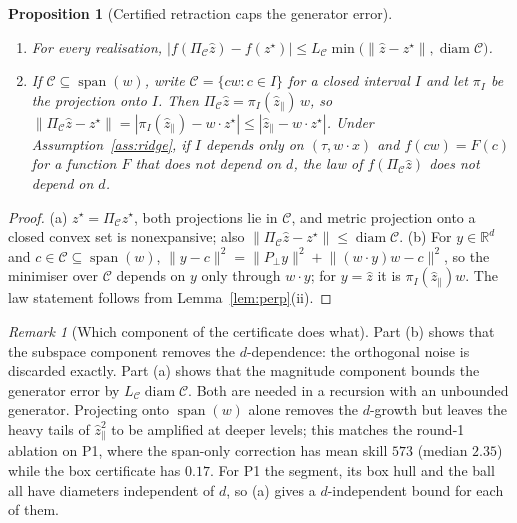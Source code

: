 \documentclass[11pt]{article}
\newtheorem{proposition}[lemma]{Proposition}
\theoremstyle{remark}
\newtheorem{remark}[lemma]{Remark}
\theoremstyle{definition}
\newcommand{\R}{\mathbb R}
\newcommand{\norm}[1]{\lVert #1\rVert}
\newcommand{\zh}{\widehat z}
\newcommand{\zpar}{\widehat z_{\parallel}}
\newcommand{\Pperp}{P_{\perp}}
\newcommand{\Proj}{\Pi}
\begin{document}
\begin{proposition}[Certified retraction caps the generator error]\label{prop:cert}
\begin{enumerate}
\item[(a)] For every realisation,
$\bigl|f(\Proj_{\mathcal C}\zh)-f(z^\star)\bigr|\le
L_{\mathcal C}\min\bigl(\norm{\zh-z^\star},\operatorname{diam}\mathcal C\bigr)$.
\item[(b)] If $\mathcal C\subseteq\operatorname{span}(w)$, write
$\mathcal C=\{cw:c\in I\}$ for a closed interval $I$ and let $\pi_I$ be the projection
onto $I$. Then $\Proj_{\mathcal C}\zh=\pi_I(\zpar)\,w$, so
$\norm{\Proj_{\mathcal C}\zh-z^\star}=|\pi_I(\zpar)-w\cdot z^\star|\le|\zpar-w\cdot z^\star|$.
Under Assumption~\ref{ass:ridge}, if $I$ depends only on $(\tau,w\cdot x)$ and
$f(cw)=F(c)$ for a function $F$ that does not depend on $d$, the law of
$f(\Proj_{\mathcal C}\zh)$ does not depend on $d$.
\end{enumerate}
\end{proposition}

\begin{proof}
(a) $z^\star=\Proj_{\mathcal C}z^\star$, both projections lie in $\mathcal C$, and metric
projection onto a closed convex set is nonexpansive; also
$\norm{\Proj_{\mathcal C}\zh-z^\star}\le\operatorname{diam}\mathcal C$.
(b) For $y\in\R^d$ and $c\in\mathcal C\subseteq\operatorname{span}(w)$,
$\norm{y-c}^2=\norm{\Pperp y}^2+\norm{(w\cdot y)w-c}^2$, so the minimiser over
$\mathcal C$ depends on $y$ only through $w\cdot y$; for $y=\zh$ it is
$\pi_I(\zpar)w$. The law statement follows from Lemma~\ref{lem:perp}(ii).
\end{proof}

\begin{remark}[Which component of the certificate does what]
Part (b) shows that the subspace component removes the $d$-dependence: the orthogonal
noise is discarded exactly. Part (a) shows that the magnitude component bounds the
generator error by $L_{\mathcal C}\operatorname{diam}\mathcal C$. Both are needed in a
recursion with an unbounded generator. Projecting onto $\operatorname{span}(w)$ alone
removes the $d$-growth but leaves the heavy tails of $\zpar^2$ to be amplified at deeper
levels; this matches the round-1 ablation on P1, where the span-only correction has mean
skill $573$ (median $2.35$) while the box certificate has $0.17$. For P1 the segment,
its box hull and the ball all have diameters independent of $d$, so (a) gives a
$d$-independent bound for each of them.
\end{remark}
\end{document}

